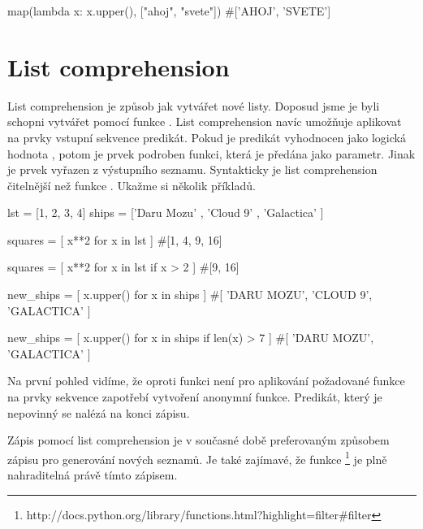\begin{python}
map(lambda x: x.upper(), ["ahoj", "svete"])
#['AHOJ', 'SVETE']
\end{python}


\section{List comprehension}
\label{sec:list-comprehension}

List comprehension je způsob jak vytvářet nové listy. Doposud jsme je byli schopni vytvářet pomocí
funkce . List comprehension navíc umožňuje aplikovat na prvky vstupní sekvence predikát.
Pokud je predikát vyhodnocen jako logická hodnota , potom je prvek podroben
funkci, která je předána jako parametr. Jinak je prvek vyřazen z výstupního seznamu.
Syntakticky je list comprehension čitelnější než funkce
. Ukažme si několik příkladů.


\begin{python}
lst = [1, 2, 3, 4]
ships = ['Daru Mozu' , 'Cloud 9' , 'Galactica' ]

squares = [ x**2 for x in lst ]
#[1, 4, 9, 16]

squares = [ x**2 for x in lst if x > 2 ]
#[9, 16]

new_ships = [ x.upper() for x in ships ]
#[ 'DARU MOZU', 'CLOUD 9', 'GALACTICA' ]

new_ships = [ x.upper() for x in ships if len(x) > 7 ]
#[ 'DARU MOZU', 'GALACTICA' ]
\end{python}

Na první pohled vidíme, že oproti funkci  není pro aplikování požadované funkce na prvky
sekvence zapotřebí vytvoření anonymní funkce. Predikát, který je nepovinný se nalézá na konci zápisu.

Zápis pomocí list comprehension je v současné době preferovaným způsobem zápisu pro generování
nových seznamů. Je také zajímavé, že funkce 
\footnote{http://docs.python.org/library/functions.html?highlight=filter\#filter}
je plně nahraditelná právě tímto zápisem.
